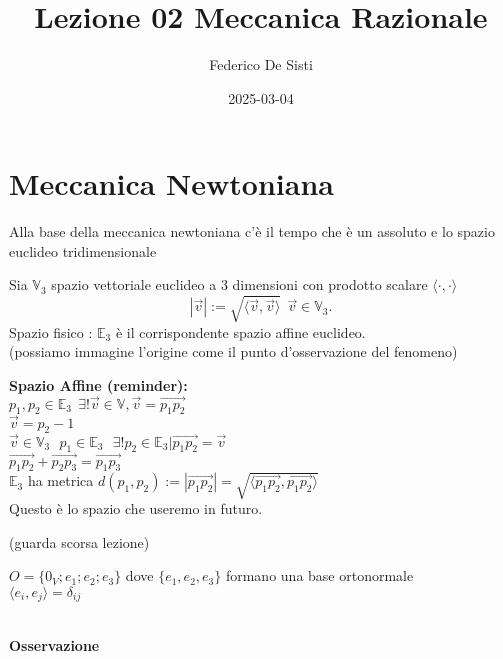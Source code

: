 \documentclass[12px]{article}
\title{Lezione 02 Meccanica Razionale}
\date{2025-03-04}
\author{Federico De Sisti}
\begin{document}
	\maketitle
	\newpage
	\section{Meccanica Newtoniana}
	Alla base della meccanica newtoniana c'è il tempo che è un assoluto e lo spazio euclideo tridimensionale\\
	\begin{defi}
	Sia $\mathbb V_3 $ spazio vettoriale euclideo a 3 dimensioni con prodotto scalare $\langle \cdot, \cdot \rangle $\\
	\[
		| \overrightarrow{v}| :=\sqrt{ \langle \overrightarrow{v}, \overrightarrow{v} \rangle } \ \ \overrightarrow{v}\in\mathbb V_3
	.\] 
	Spazio fisico : $\mathbb E_3$ è il corrispondente spazio affine euclideo.\\(possiamo immagine l'origine come il punto d'osservazione del fenomeno)
	\end{defi}
	\textbf{Spazio Affine (reminder):}\\
	$p_1,p_2\in\mathbb E_3 \ \ \exists ! \overrightarrow{v}\in\mathbb V, \overrightarrow{v}= \overrightarrow{p_1p_2}$ \\
	$\overrightarrow{v} = p_2 - 1$\\
	$\overrightarrow{v}\in \mathbb V_3\ \ \ p_1\in \mathbb E_3\ \ \ \exists! p_2\in \mathbb E_3 | \overrightarrow{p_1p_2} = \overrightarrow{v}$\\
	$ \overrightarrow{p_1p_2} + \overrightarrow{p_2p_3} = \overrightarrow{p_1p_3}$ \\
	$\mathbb E_3$ ha metrica $d(p_1,p_2) := | \overrightarrow{p_1p_2}| = \sqrt{ \langle \overrightarrow{p_1p_2}, \overrightarrow{p_1p_2} \rangle }$\\
	Questo è lo spazio che useremo in futuro.\\
	\begin{defi}
		(guarda scorsa lezione)
	\end{defi}
	\begin{defi}
		$O =\{0_V; e_1;e_2;e_3\}$ dove $\{e_1,e_2,e_3\}$ formano una base ortonormale \\$ \langle e_i, e_j \rangle  = \delta_{ij}$\\\

	\end{defi}
	\textbf{Osservazione}\\
\end{document}
